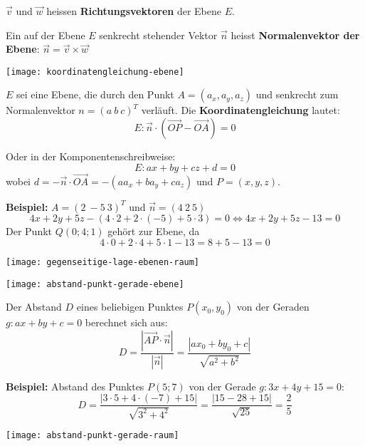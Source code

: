 $\vec{v}$ und $\vec{w}$ heissen \textbf{Richtungsvektoren} der Ebene $E$.


Ein auf der Ebene $E$ senkrecht stehender Vektor $\vec{n}$ heisst \textbf{Normalenvektor der Ebene}: $\vec{n} = \vec{v} \times \vec{w}$

\vspace{0.5em}
\begin{multicols}{2}
    \texttt{[image: koordinatengleichung-ebene]}

    $E$ sei eine Ebene, die durch den Punkt $A = (a_x, a_y, a_z)$ und senkrecht zum Normalenvektor $n = (a \ b \ c)^T$ verläuft.
    Die \textbf{Koordinatengleichung} lautet:
    \[E: \vec{n} \cdot (\vec{OP} - \vec{OA}) = 0\]
\end{multicols}

Oder in der Komponentenschreibweise:
\[E: ax + by + cz + d = 0\]
wobei $d = -\vec{n} \cdot \vec{OA} = -(a a_x + b a_y + c a_z)$ und $P = (x, y, z)$.

\textbf{Beispiel:} $A = (2 \ -5 \ 3)^T$ und $\vec{n} = (4 \ 2 \ 5)$
\[4x + 2y + 5z - (4 \cdot 2 + 2 \cdot (-5) + 5 \cdot 3) = 0 \Leftrightarrow 4x + 2y + 5z - 13 = 0\]
Der Punkt $Q(0; 4; 1)$ gehört zur Ebene, da
\[4 \cdot 0 + 2 \cdot 4 + 5 \cdot 1 - 13 = 8 + 5 - 13 = 0\]


\texttt{[image: gegenseitige-lage-ebenen-raum]}



\begin{center}
    \texttt{[image: abstand-punkt-gerade-ebene]}
\end{center}

Der Abstand $D$ eines beliebigen Punktes $P(x_0, y_0)$ von der Geraden $g: ax + by + c = 0$ berechnet sich aus:
\[D = \frac{|\vec{AP} \cdot \vec{n}|}{|\vec{n}|} = \frac{|a x_0 + b y_0 + c|}{\sqrt{a^2 + b^2}}\]

\textbf{Beispiel:} Abstand des Punktes $P(5;7)$ von der Gerade $g: 3x + 4y + 15 = 0$:
\[D = \frac{|3 \cdot 5 + 4 \cdot (-7) + 15|}{\sqrt{3^2 + 4^2}} = \frac{|15 - 28 + 15|}{\sqrt{25}} = \frac{2}{5}\]


\begin{center}
    \texttt{[image: abstand-punkt-gerade-raum]}
\end{center}

